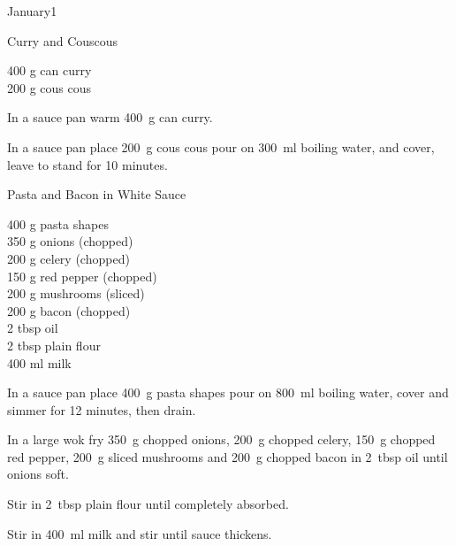 \begin{menu}{January1}
    \begin{recipe}{1}{Curry and Couscous}%
		\begin{ingredients}
		400 g can curry  \\
	200 g cous cous  \\
	
		\end{ingredients}
	
	
	
    \begin{instructions}
    \item 
        In a sauce pan warm
        400~g  can curry.
      \item 
    In a
    sauce pan 
    place
    200~g  cous cous
    pour on
    300~ml  boiling water,
    and cover, leave to stand for 10 minutes.
  
    \end{instructions}
    \end{recipe}%
  
    \begin{recipe}{2}{Pasta and Bacon in White Sauce}%
		\begin{ingredients}
		400 g pasta shapes  \\
	350 g onions (chopped) \\
	200 g celery (chopped) \\
	150 g red pepper (chopped) \\
	200 g mushrooms (sliced) \\
	200 g bacon (chopped) \\
	2 tbsp oil  \\
	2 tbsp plain flour  \\
	400 ml milk  \\
	
		\end{ingredients}
	
	
    \begin{instructions}
    \item 
    In a
    sauce pan
    place
    400~g  pasta shapes
    pour on
    800~ml  boiling water,
    cover and simmer for 12 minutes, then drain.
  \item 
        In a large wok fry
        350~g chopped onions,
        200~g chopped celery,
        150~g chopped red pepper,
        200~g sliced mushrooms
        and
        200~g chopped bacon
        in
        2~tbsp  oil
        until onions soft.
      \item 
        Stir in
        2~tbsp  plain flour
        until completely absorbed.
      \item 
        Stir in
        400~ml  milk
        and stir
        until sauce thickens.
      

\end{instructions}
\end{recipe}
\end{menu}

